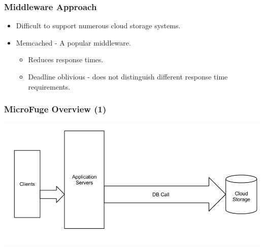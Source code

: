 \documentclass{beamer}
\newcommand{\myv}{\vspace{3 mm}}
\begin{document}
\begin{frame}
  \frametitle{Middleware Approach}
  \begin{itemize}
    \item Difficult to support numerous cloud storage systems.
      \myv
    \item Memcached - A popular middleware.
      \begin{itemize}
        \myv
      \item Reduces response times.
        \myv
      \item Deadline oblivious - does not distinguish different response time
        requirements.
      \end{itemize}
  \end{itemize}
\end{frame}


\begin{frame}
  \frametitle{MicroFuge Overview (1)}
  \begin{center}
  \includegraphics[scale=0.33]{img/MF_FULL_NEW_1.png}
  \end{center}
\end{frame}
\end{document}
